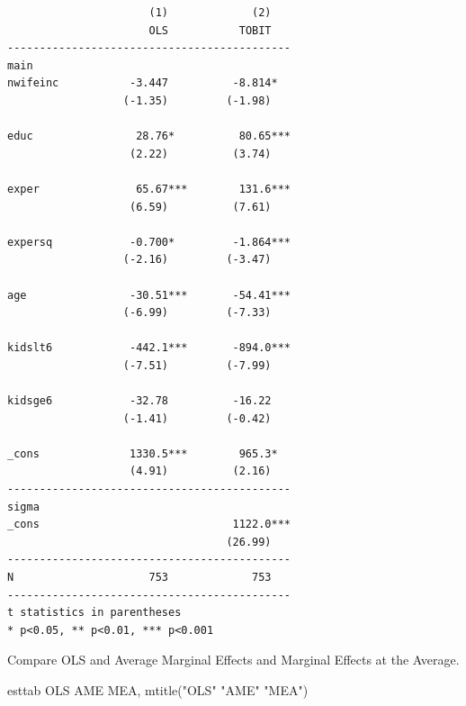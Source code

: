 \documentclass[
]{book}
\newenvironment{Shaded}{\begin{snugshade}}{\end{snugshade}}
\newcommand{\NormalTok}[1]{#1}
\newcommand{\StringTok}[1]{\textcolor[rgb]{0.31,0.60,0.02}{#1}}
\begin{document}
\begin{verbatim}
                      (1)             (2)   
                      OLS           TOBIT   
--------------------------------------------
main                                        
nwifeinc           -3.447          -8.814*  
                  (-1.35)         (-1.98)   

educ                28.76*          80.65***
                   (2.22)          (3.74)   

exper               65.67***        131.6***
                   (6.59)          (7.61)   

expersq            -0.700*         -1.864***
                  (-2.16)         (-3.47)   

age                -30.51***       -54.41***
                  (-6.99)         (-7.33)   

kidslt6            -442.1***       -894.0***
                  (-7.51)         (-7.99)   

kidsge6            -32.78          -16.22   
                  (-1.41)         (-0.42)   

_cons              1330.5***        965.3*  
                   (4.91)          (2.16)   
--------------------------------------------
sigma                                       
_cons                              1122.0***
                                  (26.99)   
--------------------------------------------
N                     753             753   
--------------------------------------------
t statistics in parentheses
* p<0.05, ** p<0.01, *** p<0.001
\end{verbatim}

Compare OLS and Average Marginal Effects and Marginal Effects at the Average.

\begin{Shaded}
\begin{Highlighting}[]
\NormalTok{esttab OLS AME MEA, mtitle(}\StringTok{"OLS"} \StringTok{"AME"} \StringTok{"MEA"}\NormalTok{)}
\end{Highlighting}
\end{Shaded}
\end{document}
